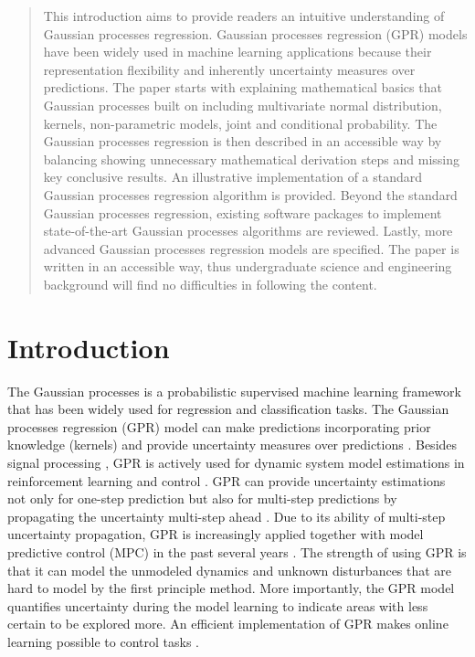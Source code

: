 \documentclass[12pt,letterpaper,fleqn,oneside,titlepage]{offroad-report}
\begin{document}
\newpage
\thispagestyle{empty}
\begin{abstract}
This introduction aims to provide readers an intuitive understanding of Gaussian processes regression. Gaussian processes regression (GPR) models have been widely used in machine learning applications because their representation flexibility and inherently uncertainty measures over predictions. The paper starts with explaining mathematical basics that Gaussian processes built on including multivariate normal distribution, kernels, non-parametric models, joint and conditional probability. The Gaussian processes regression is then described in an accessible way by balancing showing unnecessary mathematical derivation steps and missing key conclusive results. An illustrative implementation of a standard Gaussian processes regression algorithm is provided. Beyond the standard Gaussian processes regression, existing software packages to implement state-of-the-art Gaussian processes algorithms are reviewed. Lastly, more advanced Gaussian processes regression models are specified. The paper is written in an accessible way, thus undergraduate science and engineering background will find no difficulties in following the content. 
\end{abstract}


\newpage
\thispagestyle{empty}
\tableofcontents


\newpage
\setcounter{page}{1}

\section{Introduction}

The Gaussian processes is a probabilistic supervised machine learning framework that has been widely used for regression and classification tasks. The Gaussian processes regression (GPR) model can make predictions incorporating prior knowledge (kernels) and provide uncertainty measures over predictions \cite{Rasmussen2006}. Besides signal processing \cite{fuentes2020autonomous}, GPR is actively used for dynamic system model estimations in reinforcement learning \cite{Deisenroth2015} and control \cite{Ostafew2016}. GPR can provide uncertainty estimations not only for one-step prediction but also for multi-step predictions by propagating the uncertainty multi-step ahead \cite{Girard2002}. Due to its ability of multi-step uncertainty propagation, GPR is increasingly applied together with model predictive control (MPC) in the past several years \cite{Hewing2020}. The strength of using GPR is that it can model the unmodeled dynamics and unknown disturbances that are hard to model by the first principle method. More importantly, the GPR model quantifies uncertainty during the model learning to indicate areas with less certain to be explored more. An efficient implementation of GPR makes online learning possible to control tasks \cite{Kabzan2019}. 
\end{document}

